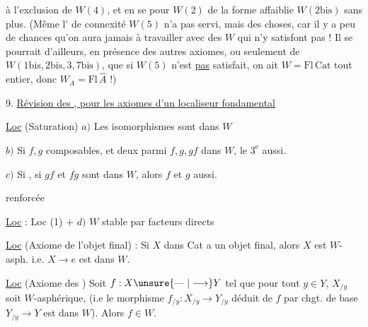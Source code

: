 à l'exclusion de $W(4)$, et en se  pour $W(2)$ de la forme affaiblie $W(2\mathrm{bis})$ sans plus. (Même l' de connexité $W(5)$ n'a pas servi, mais   des choses,  car il y a peu de chances qu'on aura jamais à travailler avec des $W$ qui n'y satisfont pas ! \deleted{\unsure{)}} Il se pourrait d'ailleurs, en présence des autres axiomes, ou seulement de $W(1\mathrm{bis},2\mathrm{bis},3,7\mathrm{bis})$, que si $W(5)$ n'est \uline{pas} satisfait, on ait $W=\mathrm{Fl}\,\mathrm{Cat}$ tout entier, donc $W_A=\mathrm{Fl}\,\widehat A$ !)


9. \uline{Révision des , pour les axiomes d'un localiseur fondamental}

\uline{Loc}  (Saturation) \quad $a)$ Les  isomorphismes sont dans $W$

$b)$ Si $f,g$ composables, et deux parmi $f,g,gf$ dans $W$, le $3^\mathrm{e}$ aussi.

$c)$ Si
,
si $gf$ et $fg$ sont dans $W$, alors $f$ et $g$ aussi.

 renforcée

\uline{Loc}  : Loc (1) $+$ \quad $d)$ $W$ stable par facteurs directs

\uline{Loc}  (Axiome de l'objet final) : Si $X$ dans Cat a un objet final, alors $X$ est $W$-asph. i.e. $X\longrightarrow e$ est dans $W$.

\uline{Loc}  (Axiome des  ) Soit $f:X\unsure{\mathrel{\text{---}}|\longrightarrow}Y$ tel que pour tout $y\in Y$, $X_{/y}$ soit $W$-asphérique, (i.e le morphisme $f_{/y}:X_{/y}\longrightarrow Y_{/y}$ déduit de $f$ par chgt. de base $Y_{/y}\longrightarrow Y$ est dans $W$). Alors $f\in W$.

